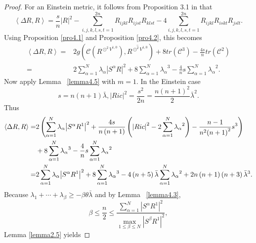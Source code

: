 \documentclass{amsart}
\theoremstyle{definition}
\theoremstyle{remark}
\numberwithin{equation}{section}
\begin{document}
\begin{proof}
For an Einstein metric, it follows from Proposition 3.1 in \cite{dai2024einstein} that
$$\left\langle {\Delta R,R} \right\rangle  = \frac{s}{n}{\left| R \right|^2}  - \sum\limits_{i,j,k,l,s,t = 1}^{2n} {{R_{ijkl}}{R_{ijst}}{R_{klst}}}  - 4\sum\limits_{i,j,k,l,s,t = 1}^{2n} {{R_{ijkl}}{R_{iskt}}{R_{jslt}}}.$$
Using Proposition \ref{pro4.1} and Proposition \ref{pro4.2}, this becomes
\begin{align*}
 \left\langle {\Delta R,R} \right\rangle  =& 2g\left( {\mathcal{C}\left( {{R^{{ \odot ^2}{V^{1,0}}}}} \right),\overline {{R^{{ \odot ^2}{V^{1,0}}}}} } \right) + 8tr\left( {{\mathcal{C}^3}} \right) - \frac{4s}{n}tr\left( {{\mathcal{C}^2}} \right)\\
 =& 2\sum\limits_{\alpha  = 1}^N {{\lambda _\alpha }{{\left| {{S^\alpha }R} \right|}^2}}  + 8\sum\limits_{\alpha  = 1}^N {{\lambda _\alpha }^3}  - \frac{4}{n}s\sum\limits_{\alpha  = 1}^N {{\lambda _\alpha }^2} .
\end{align*}
Now apply  Lemma ~\ref{lemma4.5} with $m=1$. In the Einstein case  $$s = n\left( {n + 1} \right)\bar \lambda ,{\left| {Ric} \right|^2} = \frac{{{s^2}}}{{2n}} = \frac{{n{{\left( {n + 1} \right)}^2}}}{2}{{\bar \lambda }^2}.$$ Thus
\begin{align*}
  \left\langle {\Delta R,R} \right\rangle
   =& 2\left( {\sum\limits_{\alpha  = 1}^N {{\lambda _\alpha }{{\left| {{S^\alpha }{R^1}} \right|}^2}}  + \frac{{4s}}{{n\left( {n + 1} \right)}}\left( {{{\left| {Ric} \right|}^2} - 2\sum\limits_{\alpha  = 1}^N {{\lambda _\alpha }^2} } \right) - \frac{{n - 1}}{{{n^2}{{\left( {n + 1} \right)}^2}}}{s^3}} \right) \hfill \\
   &+ 8\sum\limits_{\alpha  = 1}^N {{\lambda _\alpha }^3}  - \frac{4}{n}s\sum\limits_{\alpha  = 1}^N {{\lambda _\alpha }^2}  \hfill \\
   =& 2\sum\limits_{\alpha  = 1}^N {{\lambda _\alpha }{{\left| {{S^\alpha }{R^1}} \right|}^2}}  + 8\sum\limits_{\alpha  = 1}^N {{\lambda _\alpha }^3}  - 4\left( {n + 5} \right)\bar \lambda \sum\limits_{\alpha  = 1}^N {{\lambda _\alpha }^2}  + 2n\left( {n + 1} \right)\left( {n + 3} \right){{\bar \lambda }^3}.
\end{align*}
Because  ${\lambda _1} +  \cdots  + {\lambda _\beta} \ge  - \beta\theta \bar \lambda $ and by Lemma ~\ref{lemma4.3},  $$\beta \le \frac{n}{2} \le \frac{{\sum\limits_{\alpha  = 1}^N {{{\left| {{S^\alpha }{R^1}} \right|}^2}} }}{{\mathop {\max }\limits_{1 \le \beta  \le N}  {{{\left| {{S^\beta }{R^1}} \right|}^2}} }},$$  Lemma \ref{lemma2.5} yields

\end{proof}
\end{document}
